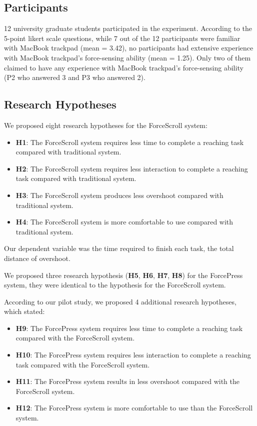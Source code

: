 \documentclass{sigchi}
\begin{document}
\subsection{Participants}
12 university graduate students participated in the experiment. According to the 5-point likert scale questions, while 7 out of the 12 participants were familiar with MacBook trackpad (mean = 3.42), no participants had extensive experience with MacBook trackpad's force-sensing ability (mean = 1.25). Only two of them claimed to have any experience with MacBook trackpad's force-sensing ability (P2 who answered 3 and P3 who answered 2).
    
\subsection{Research Hypotheses}

We proposed eight research hypotheses for the ForceScroll system:

\begin{itemize}
	\item \textbf{H1}: The ForceScroll system requires less time to complete a reaching task compared with traditional system.
	\item \textbf{H2}: The ForceScroll system requires less interaction to complete a reaching task compared with traditional system.
	\item \textbf{H3}: The ForceScroll system produces less overshoot compared with traditional system.
	\item \textbf{H4}: The ForceScroll system is more comfortable to use compared with traditional system.
\end{itemize}

Our dependent variable was the time required to finish each task, the total distance of overshoot.

We proposed three research hypothesis (\textbf{H5}, \textbf{H6}, \textbf{H7}, \textbf{H8}) for the ForcePress system, they were identical to the hypothesis for the ForceScroll system.

According to our pilot study, we proposed 4 additional research hypotheses, which stated:
\begin{itemize}
	\item \textbf{H9}: The ForcePress system requires less time to complete a reaching task compared with the ForceScroll system.
	\item \textbf{H10}: The ForcePress system requires less interaction to complete a reaching task compared with the ForceScroll system.
	\item \textbf{H11}: The ForcePress system results in less overshoot compared with the ForceScroll system.
	\item \textbf{H12}: The ForcePress system is more comfortable to use than the ForceScroll system.
\end{itemize}
\end{document}

